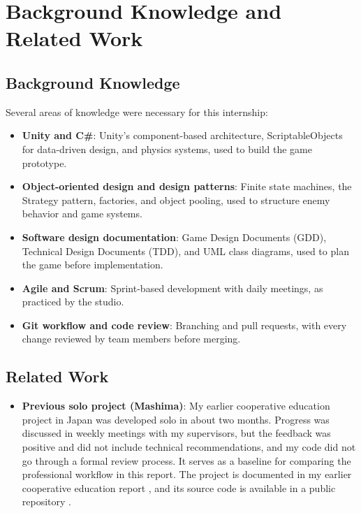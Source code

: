 \chapter{Background Knowledge and Related Work}

\section{Background Knowledge}
Several areas of knowledge were necessary for this internship:

\begin{itemize}[label=-]
    \item \textbf{Unity and C\#}: Unity's component-based architecture, ScriptableObjects for data-driven design, and physics systems, used to build the game prototype.
    \item \textbf{Object-oriented design and design patterns}: Finite state machines, the Strategy pattern, factories, and object pooling, used to structure enemy behavior and game systems.
    \item \textbf{Software design documentation}: Game Design Documents (GDD), Technical Design Documents (TDD), and UML class diagrams, used to plan the game before implementation.
    \item \textbf{Agile and Scrum}: Sprint-based development with daily meetings, as practiced by the studio.
    \item \textbf{Git workflow and code review}: Branching and pull requests, with every change reviewed by team members before merging.
\end{itemize}

\section{Related Work}
\begin{itemize}[label=-]
    \item \textbf{Previous solo project (Mashima)}: My earlier cooperative education project in Japan was developed solo in about two months. Progress was discussed in weekly meetings with my supervisors, but the feedback was positive and did not include technical recommendations, and my code did not go through a formal review process. It serves as a baseline for comparing the professional workflow in this report. The project is documented in my earlier cooperative education report \cite{uthaiwiwatkul2026mashimareport}, and its source code is available in a public repository \cite{uthaiwiwatkul2026mashimarepo}.
\end{itemize}